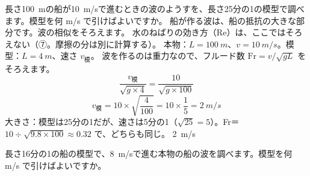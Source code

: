 \begin{phreidai}[船の模型の速さ]\label{ph:力-15:ex2}
長さ\qty{100}{m}の船が\qty{10}{m/s}で進むときの波のようすを、長さ25分の1の模型で調べます。模型を何 m/s で引けばよいですか。
\phbamen
船が作る波は、船の抵抗の大きな部分です。波の相似をそろえます。
\phmushi
水のねばりの効き方（Re）は、ここではそろえない（⑦。摩擦の分は別に計算する）。
\phzu
本物：$L=\qty{100}{m}$、$v=\qty{10}{m/s}$。模型：$L=\qty{4}{m}$、速さ $v_{\text{模}}$。
\phriyu
波を作るのは重力なので、フルード数 $\mathrm{Fr}=v/\sqrt{gL}$ をそろえます。
\phtateru
\[\frac{v_{\text{模}}}{\sqrt{g\times4}}=\frac{10}{\sqrt{g\times100}}\]
\phtoku
\[v_{\text{模}}=10\times\sqrt{\frac{4}{100}}=10\times\frac{1}{5}=\qty{2}{m/s}\]
\phtashikame
大きさ：模型は25分の1だが、速さは5分の1（$\sqrt{25}=5$）。Fr＝$10\div\sqrt{9.8\times100}\approx0.32$ で、どちらも同じ。
\kotae \qty{2}{m/s}
\end{phreidai}
\begin{jibun}
長さ16分の1の船の模型で、\qty{8}{m/s}で進む本物の船の波を調べます。模型を何 m/s で引けばよいですか。
\end{jibun}

